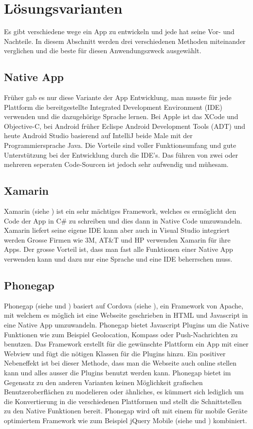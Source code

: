 \section{Lösungsvarianten}\label{loesungsvarianten}
Es gibt verschiedene wege ein App zu entwickeln und jede hat seine Vor- und Nachteile. In diesem Abschnitt werden drei verschiedenen Methoden miteinander verglichen und die beste für diesen Anwendungszweck ausgewählt.

\subsection{Native App}\label{architektur_native}
Früher gab es nur diese Variante der App Entwicklung, man musste für jede Plattform die bereitgestellte Integrated Development Environment (IDE) verwenden und die dazugehörige Sprache lernen. Bei Apple ist das XCode und Objective-C, bei Android früher Eclispe Android Development Tools (ADT) und heute Android Studio basierend auf IntelliJ beide Male mit der Programmiersprache Java. Die Vorteile sind voller Funktionsumfang und gute Unterstützung bei der Entwicklung durch die IDE's. Das führen von zwei oder mehreren seperaten Code-Sourcen ist jedoch sehr aufwendig und mühesam.

\subsection{Xamarin}\label{architektur_xamarin}
Xamarin (siehe \cite{xamarin}) ist ein sehr mächtiges Framework, welches es ermöglicht den Code der App in C\# zu schreiben und dies dann in Native Code umzuwandeln. Xamarin liefert seine eigene IDE kann aber auch in Visual Studio integriert werden Grosse Firmen wie 3M, AT\&T und HP verwenden Xamarin für ihre Apps. Der grosse Vorteil ist, dass man fast alle Funktionen einer Native App verwenden kann und dazu nur eine Sprache und eine IDE beherrschen muss. 

\subsection{Phonegap}\label{architektur_phonegapt}
Phonegap (siehe \cite{phonegap} und \cite{wargo2012phonegap}) basiert auf Cordova (siehe \cite{cordova}), ein Framework von Apache, mit welchem es möglich ist eine Webseite geschrieben in HTML und Javascript in eine Native App umzuwandeln. Phonegap bietet Javascript Plugins um die Native Funktionen wie zum Beispiel Geolocation, Kompass oder Push-Nachrichten zu benutzen. Das Framework erstellt für die gewünschte Plattform ein App mit einer Webview und fügt die nötigen Klassen für die Plugins hinzu. Ein positiver Nebeneffekt ist bei dieser Methode, dass man die Webseite auch online stellen kann und alles ausser die Plugins benutzt werden kann. Phonegap bietet im Gegensatz zu den anderen Varianten keinen Möglichkeit grafischen Benutzeroberflächen zu modelieren oder ähnliches, es kümmert sich lediglich um die Konvertierung in die verschiedenen Plattformen und stellt die Schnittstellen zu den Native Funktionen bereit. Phonegap wird oft mit einem für mobile Geräte optimiertem Framework wie zum Beispiel jQuery Mobile (siehe \cite{jquery_mobile} und \cite{reid2011jquery}) kombiniert.

